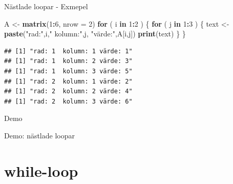 \documentclass[
  11pt,
  ignorenonframetext,
]{beamer}
\newenvironment{Shaded}{\begin{snugshade}}{\end{snugshade}}
\newcommand{\AttributeTok}[1]{\textcolor[rgb]{0.13,0.29,0.53}{#1}}
\newcommand{\ControlFlowTok}[1]{\textcolor[rgb]{0.13,0.29,0.53}{\textbf{#1}}}
\newcommand{\DecValTok}[1]{\textcolor[rgb]{0.00,0.00,0.81}{#1}}
\newcommand{\FunctionTok}[1]{\textcolor[rgb]{0.13,0.29,0.53}{\textbf{#1}}}
\newcommand{\NormalTok}[1]{#1}
\newcommand{\OtherTok}[1]{\textcolor[rgb]{0.56,0.35,0.01}{#1}}
\newcommand{\SpecialCharTok}[1]{\textcolor[rgb]{0.81,0.36,0.00}{\textbf{#1}}}
\newcommand{\StringTok}[1]{\textcolor[rgb]{0.31,0.60,0.02}{#1}}
\begin{document}
\begin{frame}[fragile]{Nästlade loopar - Exmepel}
\label{nuxe4stlade-loopar---exmepel}
\begin{Shaded}
\begin{Highlighting}[]
\NormalTok{A }\OtherTok{\textless{}{-}} \FunctionTok{matrix}\NormalTok{(}\DecValTok{1}\SpecialCharTok{:}\DecValTok{6}\NormalTok{, }\AttributeTok{nrow =} \DecValTok{2}\NormalTok{)}
\ControlFlowTok{for}\NormalTok{ ( i }\ControlFlowTok{in} \DecValTok{1}\SpecialCharTok{:}\DecValTok{2}\NormalTok{ ) \{}
  \ControlFlowTok{for}\NormalTok{ ( j }\ControlFlowTok{in} \DecValTok{1}\SpecialCharTok{:}\DecValTok{3}\NormalTok{ ) \{}
\NormalTok{    text }\OtherTok{\textless{}{-}} \FunctionTok{paste}\NormalTok{(}\StringTok{"rad:"}\NormalTok{,i,}\StringTok{" kolumn:"}\NormalTok{,j,}
                  \StringTok{"värde:"}\NormalTok{,A[i,j])}
    \FunctionTok{print}\NormalTok{(text)}
\NormalTok{  \}}
\NormalTok{\}}
\end{Highlighting}
\end{Shaded}

\pause

\begin{verbatim}
## [1] "rad: 1  kolumn: 1 värde: 1"
## [1] "rad: 1  kolumn: 2 värde: 3"
## [1] "rad: 1  kolumn: 3 värde: 5"
## [1] "rad: 2  kolumn: 1 värde: 2"
## [1] "rad: 2  kolumn: 2 värde: 4"
## [1] "rad: 2  kolumn: 3 värde: 6"
\end{verbatim}
\end{frame}

\begin{frame}{Demo}
\label{demo-2}
\begin{block}{Demo: nästlade loopar}
\label{demo-nuxe4stlade-loopar}
\end{block}
\end{frame}

\section{while-loop}\label{while-loop}
\end{document}
